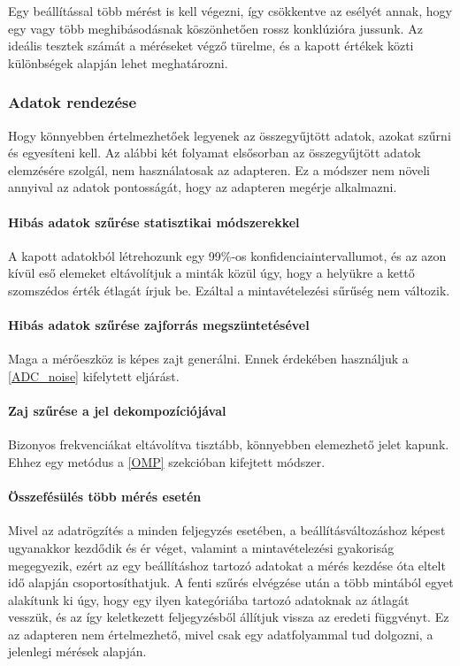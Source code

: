 Egy beállítással több mérést is kell végezni, így csökkentve az esélyét annak, hogy egy vagy több meghibásodásnak köszönhetően rossz konklúzióra jussunk. Az ideális tesztek számát a méréseket végző türelme, és a kapott értékek közti különbségek alapján lehet meghatározni.

\subsubsection{Adatok rendezése}
Hogy könnyebben értelmezhetőek legyenek az összegyűjtött adatok, azokat szűrni és egyesíteni kell. Az alábbi két folyamat elsősorban az összegyűjtött adatok elemzésére szolgál, nem használatosak az adapteren. Ez a módszer nem növeli annyival az adatok pontosságát, hogy az adapteren megérje alkalmazni.
\paragraph{Hibás adatok szűrése statisztikai módszerekkel} A kapott adatokból létrehozunk egy 99\%-os konfidenciaintervallumot, és az azon kívül eső elemeket eltávolítjuk a minták közül úgy, hogy a helyükre a kettő szomszédos érték étlagát írjuk be. Ezáltal a mintavételezési sűrűség nem változik.
\paragraph{Hibás adatok szűrése zajforrás megszüntetésével} Maga a mérőeszköz is képes zajt generálni. Ennek érdekében használjuk a \ref{ADC_noise} kifelytett eljárást.
\paragraph{Zaj szűrése a jel dekompozíciójával} Bizonyos frekvenciákat eltávolítva tisztább, könnyebben elemezhető jelet kapunk. Ehhez egy metódus a \ref{OMP} szekcióban kifejtett módszer.
\paragraph{Összefésülés több mérés esetén}
Mivel az adatrögzítés a minden feljegyzés esetében, a beállításváltozáshoz képest ugyanakkor kezdődik és ér véget, valamint a mintavételezési gyakoriság megegyezik, ezért az egy beállításhoz tartozó adatokat a mérés kezdése óta eltelt idő alapján csoportosíthatjuk. A fenti szűrés elvégzése után a több mintából egyet alakítunk ki úgy, hogy egy ilyen kategóriába tartozó adatoknak az átlagát vesszük, és az így keletkezett feljegyzésből állítjuk vissza az eredeti függvényt. Ez az adapteren nem értelmezhető, mivel csak egy adatfolyammal tud dolgozni, a jelenlegi mérések alapján.

